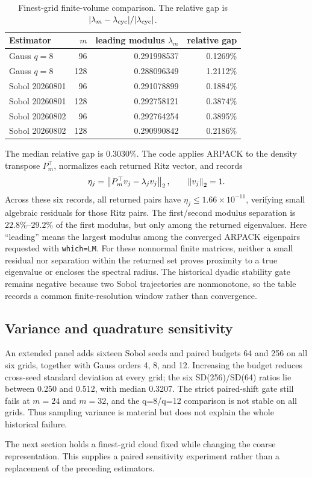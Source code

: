 \begin{table}[H]
\centering
\caption{Finest-grid finite-volume comparison.  The relative gap is
$|\lambda_m-\lambda_{\rm cyc}|/|\lambda_{\rm cyc}|$.}
\label{tab:r059-cycle-operator}
\small
\begin{tabular}{lrrr}
\toprule
Estimator & $m$ & leading modulus $\lambda_m$ & relative gap\\
\midrule
Gauss $q=8$ & 96  & 0.291998537 & 0.1269\%\\
Gauss $q=8$ & 128 & 0.288096349 & 1.2112\%\\
Sobol 20260801 & 96  & 0.291078899 & 0.1884\%\\
Sobol 20260801 & 128 & 0.292758121 & 0.3874\%\\
Sobol 20260802 & 96  & 0.292764254 & 0.3895\%\\
Sobol 20260802 & 128 & 0.290990842 & 0.2186\%\\
\bottomrule
\end{tabular}
\end{table}

The median relative gap is $0.3030\%$.  The code applies ARPACK to the density
transpose $P_m^\top$, normalizes each returned Ritz vector, and records
\begin{equation}
 \eta_j=\left\lVert P_m^\top v_j-\lambda_jv_j\right\rVert_2,
 \qquad \left\lVert v_j\right\rVert_2=1.
 \label{eq:arpack-residual}
\end{equation}
Across these six records, all returned pairs have
$\eta_j\leq1.66\times10^{-11}$, verifying small algebraic residuals for those
Ritz pairs.  The first/second modulus separation is $22.8\%$--$29.2\%$ of the
first modulus, but only among the returned eigenvalues.  Here ``leading'' means
the largest modulus among the converged ARPACK eigenpairs requested with
\texttt{which=LM}.  For these nonnormal finite matrices, neither a small
residual nor separation within the returned set proves proximity to a true
eigenvalue or encloses the spectral radius.  The historical dyadic stability
gate remains negative because two Sobol trajectories are nonmonotone, so the
table records a common finite-resolution window rather than convergence.

\subsection{Variance and quadrature sensitivity}

An extended panel adds sixteen Sobol seeds and paired budgets 64 and 256 on all
six grids, together with Gauss orders 4, 8, and 12.  Increasing the budget reduces
cross-seed standard deviation at every grid; the six SD(256)/SD(64) ratios lie
between 0.250 and 0.512, with median 0.3207.  The strict paired-shift gate
still fails at $m=24$ and $m=32$, and the q=8/q=12 comparison is not stable on
all grids.  Thus sampling variance is material but does not explain the whole
historical failure.

The next section holds a finest-grid cloud fixed while changing the coarse
representation.  This supplies a paired sensitivity experiment rather than a
replacement of the preceding estimators.
